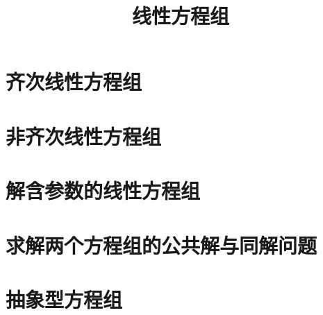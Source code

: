 \documentclass[UTF8]{ctexart}
\title{线性方程组}
\begin{document}
	\tableofcontents %
	\date{} %
	\maketitle  %
	
	
	\section{齐次线性方程组}
	
	
	
	
	
	\section{非齐次线性方程组}
	
	
	
	
	\section{解含参数的线性方程组}
	
	
	\section{求解两个方程组的公共解与同解问题}
	

	
	\section{抽象型方程组}
	
	
	
	
\end{document}
